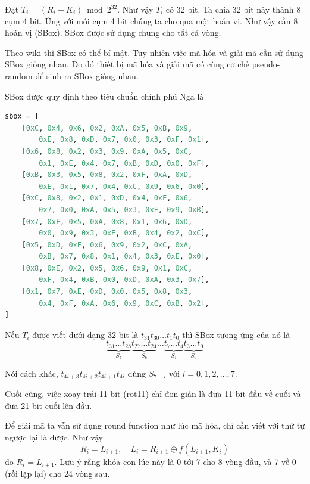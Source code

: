 Đặt $T_i = (R_i + K_i) \bmod 2^{32}$. Như vậy $T_i$ có 32 bit. Ta 
chia 32 bit này thành 8 cụm 4 bit. Ứng với mỗi cụm 4 bit chúng ta 
cho qua một hoán vị. Như vậy cần 8 hoán vị (SBox). SBox được sử dụng
chung cho tất cả vòng.

Theo wiki thì SBox có thể bí mật. Tuy nhiên việc mã hóa và giải
mã cần sử dụng SBox giống nhau. Do đó thiết bị mã hóa và giải mã
có cùng cơ chế pseudo-random để sinh ra SBox giống nhau.

SBox được quy định theo tiêu chuẩn chính phủ Nga là

\begin{lstlisting}[language=Python]
sbox = [
    [0xC, 0x4, 0x6, 0x2, 0xA, 0x5, 0xB, 0x9, 
        0xE, 0x8, 0xD, 0x7, 0x0, 0x3, 0xF, 0x1],
    [0x6, 0x8, 0x2, 0x3, 0x9, 0xA, 0x5, 0xC, 
        0x1, 0xE, 0x4, 0x7, 0xB, 0xD, 0x0, 0xF],
    [0xB, 0x3, 0x5, 0x8, 0x2, 0xF, 0xA, 0xD, 
        0xE, 0x1, 0x7, 0x4, 0xC, 0x9, 0x6, 0x0],
    [0xC, 0x8, 0x2, 0x1, 0xD, 0x4, 0xF, 0x6, 
        0x7, 0x0, 0xA, 0x5, 0x3, 0xE, 0x9, 0xB],
    [0x7, 0xF, 0x5, 0xA, 0x8, 0x1, 0x6, 0xD, 
        0x0, 0x9, 0x3, 0xE, 0xB, 0x4, 0x2, 0xC],
    [0x5, 0xD, 0xF, 0x6, 0x9, 0x2, 0xC, 0xA, 
        0xB, 0x7, 0x8, 0x1, 0x4, 0x3, 0xE, 0x0],
    [0x8, 0xE, 0x2, 0x5, 0x6, 0x9, 0x1, 0xC, 
        0xF, 0x4, 0xB, 0x0, 0xD, 0xA, 0x3, 0x7],
    [0x1, 0x7, 0xE, 0xD, 0x0, 0x5, 0x8, 0x3, 
        0x4, 0xF, 0xA, 0x6, 0x9, 0xC, 0xB, 0x2],
]
\end{lstlisting}

Nếu $T_i$ được viết dưới dạng 32 bit là $t_{31} t_{30} \ldots t_1 t_0$
thì SBox tương ứng của nó là
\[
    \underbrace{t_{31} \ldots t_{28}}_{S_7}
    \underbrace{t_{27} \ldots t_{24}}_{S_6}
    \ldots
    \underbrace{t_{7} \ldots t_{4}}_{S_1}
    \underbrace{t_3 \ldots t_0}_{S_0}
\]

Nói cách khác, $t_{4i+3} t_{4i+2} t_{4i+1} t_{4i}$ dùng $S_{7-i}$ với
$i = 0, 1, 2, \ldots, 7$.

Cuối cùng, việc xoay trái 11 bit (rot11) chỉ đơn giản là đưa 11 bit đầu
về cuối và đưa 21 bit cuối lên đầu.

Để giải mã ta vẫn sử dụng round function như lúc mã hóa, 
chỉ cần viết với thứ tự ngược lại là được. Như vậy
\[R_i = L_{i+1}, \quad L_i = R_{i+1} \oplus f(L_{i+1}, K_i)\]
do $R_i = L_{i+1}$. Lưu ý rằng khóa con lúc này là 0 tới 7 cho 
8 vòng đầu, và 7 về 0 (rồi lặp lại) cho 24 vòng sau.